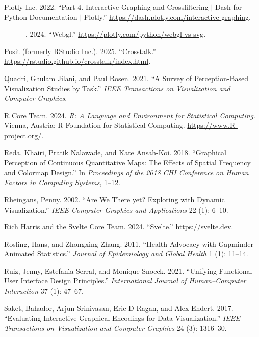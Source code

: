 \documentclass[
]{book}
\newlength{\cslhangindent}
\newenvironment{CSLReferences}[2] %
 {\begin{list}{}{%
  \setlength{\itemindent}{0pt}
  \setlength{\leftmargin}{0pt}
  \setlength{\parsep}{0pt}
  \ifodd #1
   \setlength{\leftmargin}{\cslhangindent}
   \setlength{\itemindent}{-1\cslhangindent}
  \fi
  \setlength{\itemsep}{#2\baselineskip}}}
 {\end{list}}
\begin{document}
\begin{CSLReferences}{1}{0}
Plotly Inc. 2022. {``{Part 4. Interactive Graphing and Crossfiltering {\(\vert\)} Dash for Python Documentation {\(\vert\)} Plotly}.''} \url{https://dash.plotly.com/interactive-graphing}.

---------. 2024. {``Webgl.''} \url{https://plotly.com/python/webgl-vs-svg}.

Posit (formerly RStudio Inc.). 2025. {``{Crosstalk}.''} \url{https://rstudio.github.io/crosstalk/index.html}.

Quadri, Ghulam Jilani, and Paul Rosen. 2021. {``A Survey of Perception-Based Visualization Studies by Task.''} \emph{IEEE Transactions on Visualization and Computer Graphics}.

R Core Team. 2024. \emph{R: A Language and Environment for Statistical Computing}. Vienna, Austria: R Foundation for Statistical Computing. \url{https://www.R-project.org/}.

Reda, Khairi, Pratik Nalawade, and Kate Ansah-Koi. 2018. {``Graphical Perception of Continuous Quantitative Maps: The Effects of Spatial Frequency and Colormap Design.''} In \emph{Proceedings of the 2018 CHI Conference on Human Factors in Computing Systems}, 1--12.

Rheingans, Penny. 2002. {``Are We There yet? Exploring with Dynamic Visualization.''} \emph{IEEE Computer Graphics and Applications} 22 (1): 6--10.

Rich Harris and the Svelte Core Team. 2024. {``Svelte.''} \url{https://svelte.dev}.

Rosling, Hans, and Zhongxing Zhang. 2011. {``Health Advocacy with Gapminder Animated Statistics.''} \emph{Journal of Epidemiology and Global Health} 1 (1): 11--14.

Ruiz, Jenny, Estefanı́a Serral, and Monique Snoeck. 2021. {``Unifying Functional User Interface Design Principles.''} \emph{International Journal of Human--Computer Interaction} 37 (1): 47--67.

Saket, Bahador, Arjun Srinivasan, Eric D Ragan, and Alex Endert. 2017. {``Evaluating Interactive Graphical Encodings for Data Visualization.''} \emph{IEEE Transactions on Visualization and Computer Graphics} 24 (3): 1316--30.


\end{CSLReferences}
\end{document}

